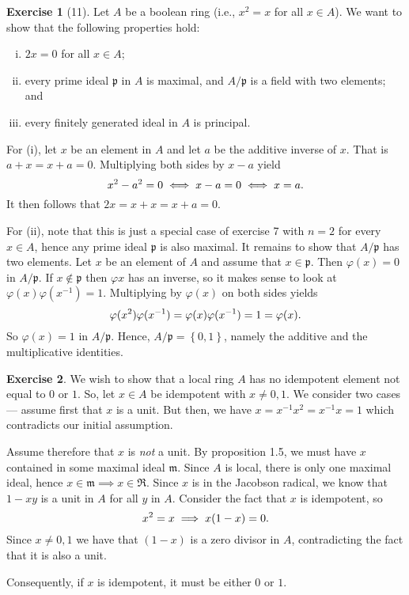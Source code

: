 \documentclass{article}
\theoremstyle{definition}
\newtheorem*{exercise}{Exercise}
\begin{document}
\begin{exercise}[11]
	Let $A$ be a boolean ring (i.e., $x^2 = x$ for all $x \in A$). We want
	to show that the following properties hold:
	\begin{enumerate}[(i)]
		\item $2x = 0$ for all $x \in A$;
		\item every prime ideal $\mathfrak{p}$ in $A$ is maximal, and
			$A / \mathfrak{p}$ is a field with two elements; and
		\item every finitely generated ideal in $A$ is principal.
	\end{enumerate}
	For (i), let $x$ be an element in $A$ and let $a$ be the additive
	inverse of $x$. That is $a + x = x + a = 0$. Multiplying both sides by
	$x - a$ yield
	\begin{equation}
		\notag
		x^2 - a^2 = 0 \iff x - a = 0 \iff x = a.
	\end{equation}
	It then follows that $2x = x + x = x + a = 0$.

	For (ii), note that this is just a special case of exercise 7 with $n =
	2$ for every $x \in A$, hence any prime ideal $\mathfrak{p}$ is also
	maximal. It remains to show that $A / \mathfrak{p}$ has two elements.
	Let $x$ be an element of $A$ and assume that $x \in \mathfrak{p}$. Then
	$\varphi(x) = 0$ in $A / \mathfrak{p}$. If $x \notin \mathfrak{p}$ then
	$\varphi{x}$ has an inverse, so it makes sense to look at
	$\varphi(x)\varphi(x^{-1}) = 1$. Multiplying by $\varphi(x)$ on both
	sides yields
	\begin{equation}
		\notag
		\varphi(x^2)\varphi(x^{-1}) = \varphi(x)\varphi(x^{-1}) = 1 = \varphi(x).
	\end{equation}
	So $\varphi(x) = 1$ in $A / \mathfrak{p}$. Hence, $A / \mathfrak{p} =
	\left\{0, 1\right\}$, namely the additive and the multiplicative
	identities.
\end{exercise}

\begin{exercise}{12}
	We wish to show that a local ring $A$ has no idempotent element not
	equal to $0$ or $1$. So, let $x \in A$ be idempotent with $x \neq 0,
	1$. We consider two cases --- assume first that $x$ is a unit. But
	then, we have $x = x^{-1}x^2 = x^{-1}x = 1$ which contradicts our
	initial assumption.

	Assume therefore that $x$ is \emph{not} a unit. By proposition 1.5, we
	must have $x$ contained in some maximal ideal $\mathfrak{m}$. Since $A$
	is local, there is only one maximal ideal, hence $x \in \mathfrak{m}
	\implies x \in \mathfrak{R}$. Since $x$ is in the Jacobson radical, we
	know that $1 - xy$ is a unit in $A$ for all $y$ in $A$. Consider the
	fact that $x$ is idempotent, so
	\begin{equation}
		\notag
		x^2 = x \implies x(1 - x) = 0.
	\end{equation}
	Since $x \neq 0, 1$ we have that $(1 - x)$ is a zero divisor in $A$,
	contradicting the fact that it is also a unit.

	Consequently, if $x$ is idempotent, it must be either $0$ or $1$.
\end{exercise}
\end{document}
